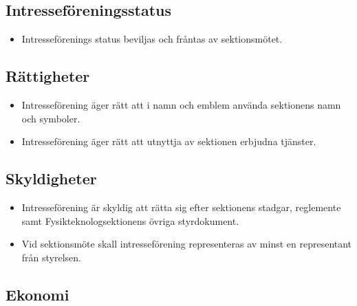 \documentclass[11pt,a4paper]{article}
\begin{document}
\subsection{Intresseföreningsstatus}

\begin{itemize}

  \item Intresseförenings status beviljas och fråntas av
  sektionsmötet.

\end{itemize}

\subsection{Rättigheter}

\begin{itemize}

  \item Intresseförening äger rätt att i namn och emblem använda
  sektionens namn och symboler.

  \item Intresseförening äger rätt att utnyttja av sektionen erbjudna
  tjänster.

\end{itemize}

\subsection{Skyldigheter}

\begin{itemize}

  
  \item Intresseförening är skyldig att rätta sig efter sektionens stadgar, reglemente samt Fysikteknologsektionens övriga styrdokument.

  
  \item Vid sektionsmöte skall intresseförening representeras av minst en representant från styrelsen.

\end{itemize}

\subsection{Ekonomi}
\end{document}
